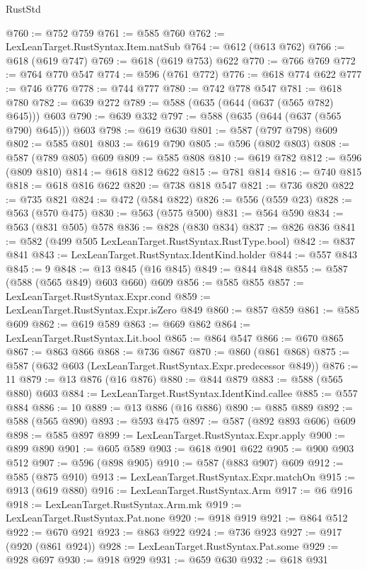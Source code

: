 \begin{lexlean}{RustStd}
\begin{coremodule}
@760 := @752 @759
@761 := @585 @760
@762 := LexLeanTarget.RustSyntax.Item.natSub
@764 := @612 (@613 @762)
@766 := @618 (@619 @747)
@769 := @618 (@619 @753) @622
@770 := @766 @769
@772 := @764 @770 @547
@774 := @596 (@761 @772)
@776 := @618 @774 @622
@777 := @746 @776
@778 := @744 @777
@780 := @742 @778 @547
@781 := @618 @780
@782 := @639 @272
@789 := @588 (@635 (@644 (@637 (@565 @782) @645))) @603
@790 := @639 @332
@797 := @588 (@635 (@644 (@637 (@565 @790) @645))) @603
@798 := @619 @630
@801 := @587 (@797 @798) @609
@802 := @585 @801
@803 := @619 @790
@805 := @596 (@802 @803)
@808 := @587 (@789 @805) @609
@809 := @585 @808
@810 := @619 @782
@812 := @596 (@809 @810)
@814 := @618 @812 @622
@815 := @781 @814
@816 := @740 @815
@818 := @618 @816 @622
@820 := @738 @818 @547
@821 := @736 @820
@822 := @735 @821
@824 := @472 (@584 @822)
@826 := @556 (@559 @23)
@828 := @563 (@570 @475)
@830 := @563 (@575 @500)
@831 := @564 @590
@834 := @563 (@831 @505) @578
@836 := @828 (@830 @834)
@837 := @826 @836
@841 := @582 (@499 @505 LexLeanTarget.RustSyntax.RustType.bool)
@842 := @837 @841
@843 := LexLeanTarget.RustSyntax.IdentKind.holder
@844 := @557 @843
@845 := 9
@848 := @13 @845 (@16 @845)
@849 := @844 @848
@855 := @587 (@588 (@565 @849) @603 @660) @609
@856 := @585 @855
@857 := LexLeanTarget.RustSyntax.Expr.cond
@859 := LexLeanTarget.RustSyntax.Expr.isZero @849
@860 := @857 @859
@861 := @585 @609
@862 := @619 @589
@863 := @669 @862
@864 := LexLeanTarget.RustSyntax.Lit.bool
@865 := @864 @547
@866 := @670 @865
@867 := @863 @866
@868 := @736 @867
@870 := @860 (@861 @868)
@875 := @587 (@632 @603 (LexLeanTarget.RustSyntax.Expr.predecessor @849))
@876 := 11
@879 := @13 @876 (@16 @876)
@880 := @844 @879
@883 := @588 (@565 @880) @603
@884 := LexLeanTarget.RustSyntax.IdentKind.callee
@885 := @557 @884
@886 := 10
@889 := @13 @886 (@16 @886)
@890 := @885 @889
@892 := @588 (@565 @890)
@893 := @593 @475
@897 := @587 (@892 @893 @606) @609
@898 := @585 @897
@899 := LexLeanTarget.RustSyntax.Expr.apply
@900 := @899 @890
@901 := @605 @589
@903 := @618 @901 @622
@905 := @900 @903 @512
@907 := @596 (@898 @905)
@910 := @587 (@883 @907) @609
@912 := @585 (@875 @910)
@913 := LexLeanTarget.RustSyntax.Expr.matchOn
@915 := @913 (@619 @880)
@916 := LexLeanTarget.RustSyntax.Arm
@917 := @6 @916
@918 := LexLeanTarget.RustSyntax.Arm.mk
@919 := LexLeanTarget.RustSyntax.Pat.none
@920 := @918 @919
@921 := @864 @512
@922 := @670 @921
@923 := @863 @922
@924 := @736 @923
@927 := @917 (@920 (@861 @924))
@928 := LexLeanTarget.RustSyntax.Pat.some
@929 := @928 @697
@930 := @918 @929
@931 := @659 @630
@932 := @618 @931

\end{coremodule}
\end{lexlean}
